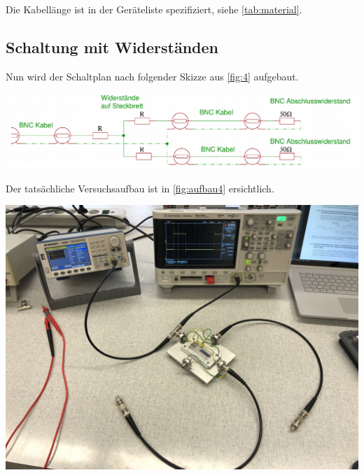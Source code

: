 \documentclass[11pt,ngerman]{scrartcl}
\begin{document}
\noindent Die Kabellänge ist in der Geräteliste spezifiziert, siehe \autoref{tab:material}.

\subsection{Schaltung mit Widerständen}

\noindent Nun wird der Schaltplan nach folgender Skizze aus \autoref{fig:4} aufgebaut.

\begin{center}
	\begin{minipage}[t]{0.8\textwidth}
		\includegraphics[width=\textwidth]{4}
		\label{fig:4}
	\end{minipage}
\end{center}

\noindent Der tatsächliche Versuchsaufbau ist in \autoref{fig:aufbau4} ersichtlich.

\begin{center}
	\begin{minipage}[t]{0.7\textwidth}
		\includegraphics[width=\textwidth]{aufbau4}
		\label{fig:aufbau4}
	\end{minipage}
\end{center}
\end{document}
